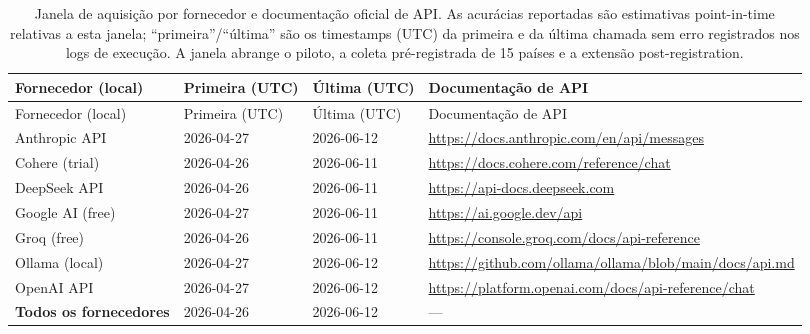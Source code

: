\begin{longtable}{lp{2.0cm}p{2.0cm}p{5.3cm}}
\caption{Janela de aquisição por fornecedor e documentação oficial de API. As acurácias reportadas são estimativas point-in-time relativas a esta janela; ``primeira''/``última'' são os timestamps (UTC) da primeira e da última chamada sem erro registrados nos logs de execução. A janela abrange o piloto, a coleta pré-registrada de 15 países e a extensão post-registration.\label{tab:s-acquisition}}\\
\toprule
Fornecedor (local) & Primeira (UTC) & Última (UTC) & Documentação de API \\
\midrule \endfirsthead
\toprule Fornecedor (local) & Primeira (UTC) & Última (UTC) & Documentação de API \\ \midrule \endhead
Anthropic API & 2026-04-27 & 2026-06-12 & \url{https://docs.anthropic.com/en/api/messages} \\
Cohere (trial) & 2026-04-26 & 2026-06-11 & \url{https://docs.cohere.com/reference/chat} \\
DeepSeek API & 2026-04-26 & 2026-06-11 & \url{https://api-docs.deepseek.com} \\
Google AI (free) & 2026-04-27 & 2026-06-11 & \url{https://ai.google.dev/api} \\
Groq (free) & 2026-04-26 & 2026-06-11 & \url{https://console.groq.com/docs/api-reference} \\
Ollama (local) & 2026-04-27 & 2026-06-12 & \url{https://github.com/ollama/ollama/blob/main/docs/api.md} \\
OpenAI API & 2026-04-27 & 2026-06-12 & \url{https://platform.openai.com/docs/api-reference/chat} \\
\midrule
\textbf{Todos os fornecedores} & 2026-04-26 & 2026-06-12 & --- \\
\bottomrule
\end{longtable}
